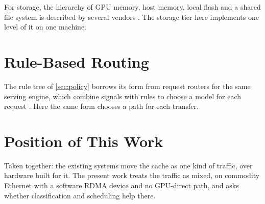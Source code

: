 For storage, the hierarchy of GPU memory, host memory, local flash and a
shared file system is described by several vendors
\citep{hsu2026fourtier,hsu2026kv,ibm2025storage}. The storage tier here
implements one level of it on one machine.

\section{Rule-Based Routing}

The rule tree of \cref{sec:policy} borrows its form from request routers
for the same serving engine, which combine signals with rules to choose a
model for each request \citep{liu2026router,wang2025router}. Here the same
form chooses a path for each transfer.

\section{Position of This Work}

Taken together: the existing systems move the cache as one kind of traffic,
over hardware built for it. The present work treats the traffic as mixed, on
commodity Ethernet with a software RDMA device and no GPU-direct path, and
asks whether classification and scheduling help there.
